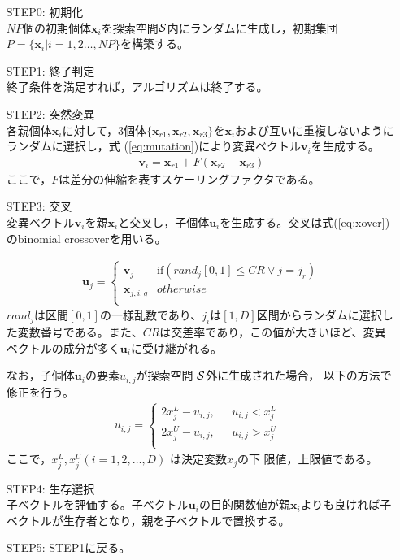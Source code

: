 \documentclass[a4paper,12pt]{jsreport}
\begin{document}
\begin{enumerate}

\item[STEP0:]\mbox{初期化}\\ 
$NP$個の初期個体$\bm{x}_i$を探索空間$\cal{S}$内にランダムに生成し，初期集団$P= \{ \bm{x}_i| i=1,2 \dots ,NP \}$を構築する。

\item[STEP1:]\mbox{終了判定}\\ 
終了条件を満足すれば，アルゴリズムは終了する。

\item[STEP2:]\mbox{突然変異}\\ 
各親個体$\bm{x}_i$に対して，3個体$ \{  \bm{x}_{r1},\bm{x}_{r2},\bm{x}_{r3}  \} $を$\bm{x}_i$および互いに重複しないようにランダムに選択し，式
(\ref{eq:mutation})により変異ベクトル$\bm{v}_i$を生成する。
 \begin{eqnarray}
 \bm{v}_i= \bm{x}_{r1}+ F (\bm{x}_{r2}-\bm{x}_{r3})
\label{eq:mutation}
\end{eqnarray}
ここで，$F$は差分の伸縮を表すスケーリングファクタである。

\item[STEP3:]\mbox{交叉}\\ 
変異ベクトル$\bm{v}_i$を親$\bm{x}_i$と交叉し，子個体$\bm{u}_{i}$を生成する。交叉は式(\ref{eq:xover})のbinomial crossoverを用いる。

\begin{eqnarray}
\bm{u}_j=
\left\{
\begin{array}{cc}
    \bm{v}_j & \mbox{if$({rand}_j[0,1]\leq CR \vee j={j}_r)$}\\
    \bm{x}_{j,i,g} & \mbox{$otherwise$}\\
\end{array}
\right.
\label{eq:xover}
\end{eqnarray}
${rand}_j$は区間$[0,1]$の一様乱数であり、${j}_i$は$[1,D]$区間からランダムに選択した変数番号である。また、$CR$は交差率であり，この値が大きいほど、変異ベクトルの成分が多く$\bm{u}_i$に受け継がれる。

なお，子個体$\bm{u}_i$の要素$u_{i,j}$が探索空間 $\cal{S}$外に生成された場合，
以下の方法で修正を行う。
\begin{eqnarray}
u_{i,j} =
\left\{
\begin{array}{ll}
 2x^{L}_j-u_{i,j},  & \mbox{ $u_{i,j} <x^{L}_j $   } \\
  2x^{U}_j-u_{i,j},		   & \mbox{ $u_{i,j} >x^{U}_j $ } \\
\end{array}
\right.
\end{eqnarray}
ここで，$x^{L}_j, x^{U}_j (i = 1, 2, \dots ,D)$ は決定変数$x_j$の下
限値，上限値である。

\item[STEP4:]\mbox{生存選択}\\ 
子ベクトルを評価する。子ベクトル$\bm{u}_{i}$の目的関数値が親$\bm{x}_i$よりも良ければ子ベクトルが生存者となり，親を子ベクトルで置換する。

\item[STEP5:]\mbox{STEP1に戻る。}\\ 

\end{enumerate}
\end{document}
